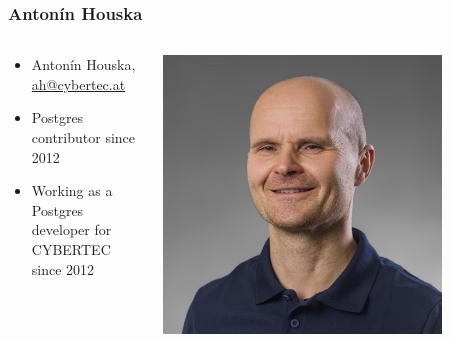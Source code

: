 \newcommand{\linksize}{\scriptsize}


\begin{frame}[plain]
  \titlepage
\end{frame}

\begin{frame}
  \frametitle{Antonín Houska}

  \begin{columns}
    \begin{column}{0.8\textwidth}
      \begin{itemize}
	\item Antonín Houska, \href{mailto:ah@cybertec.at}{ah@cybertec.at}
	\item Postgres contributor since 2012
	\item Working as a Postgres developer for CYBERTEC since 2012
      \end{itemize}
    \end{column}
    \begin{column}{0.2\textwidth}
      \begin{center}
      \includegraphics[width=0.8\textwidth]{Antonin-Houska-faceshot.jpg}
      \end{center}
    \end{column}
  \end{columns}
\end{frame}

